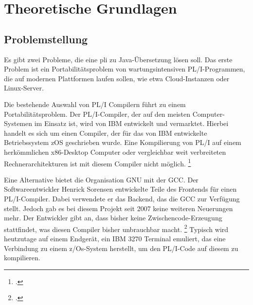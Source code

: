 



\pagebreak
\section{Theoretische Grundlagen}
\subsection{Problemstellung}
	
Es gibt zwei Probleme, die eine \ac{pli} zu Java-Übersetzung lösen soll. 
Das erste Problem ist ein Portabilitätsproblem von wartungsintensiven PL/I-Programmen, die auf modernen Plattformen laufen sollen, wie etwa Cloud-Instanzen oder Linux-Server.

Die bestehende Auswahl von PL/I Compilern führt zu einem Portabilitätsproblem. Der PL/I-Compiler, der auf den meisten Computer-Systemen im Einsatz ist, wird von IBM entwickelt und vermarktet. Hierbei handelt es sich um einen Compiler, der für das von IBM entwickelte Betriebssystem \ac{zOS} geschrieben wurde. Eine Kompilierung von PL/I auf einem herkömmlichen x86-Desktop Computer oder vergleichbar weit verbreiteten Rechnerarchitekturen ist mit diesem Compiler nicht möglich. \footcite[Vgl. ][]{plicomp}


Eine Alternative bietet die Organisation GNU mit der \ac{GCC}. Der Softwareentwickler Henrick Sorensen entwickelte Teile des Frontends für einen PL/I-Compiler. Dabei verwendete er das Backend, das die \ac{GCC} zur Verfügung stellt. Jedoch gab es bei diesem Projekt seit 2007 keine weiteren Neuerungen mehr. Der Entwickler gibt an, dass bisher keine Zwischencode-Erzeugung stattfindet, was diesen Compiler bisher unbrauchbar macht. \footcite[Vgl. ][]{pligcc} 
Typisch wird heutzutage auf einem Endgerät, ein IBM 3270 Terminal emuliert, das eine Verbindung zu einem z/Os-System herstellt, um den PL/I-Code auf diesem zu kompilieren.

